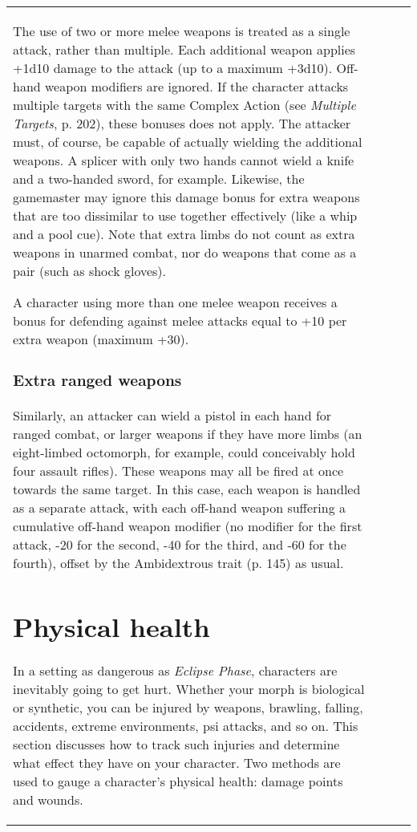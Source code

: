 \begin{table}
\begin{tabular}{|p{8cm}|r|r|r|}
The use of two or more melee weapons is treated as a single attack, rather than multiple. Each additional weapon applies +1d10 damage to the attack (up to a maximum +3d10). Off-hand weapon modifiers are ignored. If the character attacks multiple targets with the same Complex Action (see \emph{Multiple Targets}, p. 202), these bonuses does not apply. The attacker must, of course, be capable of actually wielding the additional weapons. A splicer with only two hands cannot wield a knife and a two-handed sword, for example. Likewise, the gamemaster may ignore this damage bonus for extra weapons that are too dissimilar to use together effectively (like a whip and a pool cue). Note that extra limbs do not count as extra weapons in unarmed combat, nor do weapons that come as a pair (such as shock gloves). 

A character using more than one melee weapon receives a bonus for defending against melee attacks equal to +10 per extra weapon (maximum +30). 

\subsubsection{Extra ranged weapons} 

Similarly, an attacker can wield a pistol in each hand for ranged combat, or larger weapons if they have more limbs (an eight-limbed octomorph, for example, could conceivably hold four assault rifles). These weapons may all be fired at once towards the same target. In this case, each weapon is handled as a separate attack, with each off-hand weapon suffering a cumulative off-hand weapon modifier (no modifier for the first attack, -20 for the second, -40 for the third, and -60 for the fourth), offset by the Ambidextrous trait (p. 145) as usual. 

\section{Physical health} \label{sec:physical-health} 

In a setting as dangerous as \emph{Eclipse Phase}, characters are inevitably going to get hurt. Whether your morph is biological or synthetic, you can be injured by weapons, brawling, falling, accidents, extreme environments, psi attacks, and so on. This section discusses how to track such injuries and determine what effect they have on your character. Two methods are used to gauge a character’s physical health: damage points and wounds. 


\end{tabular}
\end{table}
